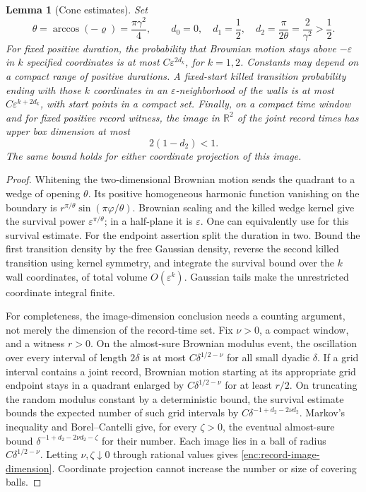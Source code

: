 \documentclass[11pt]{article}
\numberwithin{equation}{section}
\newtheorem{lemma}[theorem]{Lemma}
\theoremstyle{definition}
\theoremstyle{remark}
\newcommand{\R}{\mathbb R}
\newcommand{\1}{\mathbf 1}
\begin{document}
\begin{lemma}[Cone estimates]\label{enc:cone-estimates}
Set
\[
 \theta=\arccos(-\varrho)=\frac{\pi\gamma^2}{4},\qquad
 d_0=0,\quad d_1=\frac12,\quad d_2=\frac{\pi}{2\theta}
       =\frac2{\gamma^2}>\frac12.
\]
For fixed positive duration, the probability that Brownian motion stays
above $-\varepsilon$ in $k$ specified coordinates is at most
$C\varepsilon^{2d_k}$, for $k=1,2$.  Constants may depend on a compact
range of positive durations.  A fixed-start killed transition probability
ending with those $k$ coordinates in an $\varepsilon$-neighborhood of the
walls is at most $C\varepsilon^{k+2d_k}$, with start points in a compact
set.  Finally, on a compact time window and for fixed positive record
witness, the image in $\R^2$ of the joint record times has upper box
dimension at most
\begin{equation}\label{enc:record-image-dimension}
 2(1-d_2)<1.
\end{equation}
The same bound holds for either coordinate projection of this image.
\end{lemma}

\begin{proof}
Whitening the two-dimensional Brownian motion sends the quadrant to a
wedge of opening $\theta$.  Its positive homogeneous harmonic function
vanishing on the boundary is $r^{\pi/\theta}
\sin(\pi\varphi/\theta)$.  Brownian scaling and the killed wedge kernel
give the survival power $\varepsilon^{\pi/\theta}$; in a half-plane it
is $\varepsilon$.  One can equivalently use
\cite[Lemma 3.2]{GwynneMaoSunFKI} for this survival estimate.
For the endpoint assertion split the duration in two.  Bound the first
transition density by the free Gaussian density, reverse the second
killed transition using kernel symmetry, and integrate the survival
bound over the $k$ wall coordinates, of total volume $O(\varepsilon^k)$.
Gaussian tails make the unrestricted coordinate integral finite.

For completeness, the image-dimension conclusion needs a counting
argument, not merely the dimension of the record-time set.  Fix
$\nu>0$, a compact window, and a witness $r>0$.  On the almost-sure
Brownian modulus event, the oscillation over every interval of length
$2\delta$ is at most $C\delta^{1/2-\nu}$ for all small dyadic $\delta$.
If a grid interval contains a joint record, Brownian motion starting at
its appropriate grid endpoint stays in a quadrant enlarged by
$C\delta^{1/2-\nu}$ for at least $r/2$.  On truncating the random modulus
constant by a deterministic bound, the survival estimate bounds the
expected number of such grid intervals by
$C\delta^{-1+d_2-2\nu d_2}$.
Markov's inequality and Borel--Cantelli give, for every $\zeta>0$,
the eventual almost-sure bound
$\delta^{-1+d_2-2\nu d_2-\zeta}$ for their number.
Each image lies in a ball of radius
$C\delta^{1/2-\nu}$.  Letting $\nu,\zeta\downarrow0$ through rational values
gives \eqref{enc:record-image-dimension}.  Coordinate projection cannot
increase the number or size of covering balls.
\end{proof}
\end{document}
